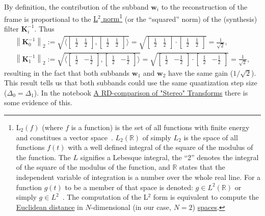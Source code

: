 By definition, the contribution of the subband ${\mathbf w}_i$ to the reconstruction of the frame  is
proportional to the
\href{https://en.wikipedia.org/wiki/Lp_space}{L$^2$
  norm}\footnote{L$_2(f)$ (where $f$ is a function) is the set of all
  functions with finite energy and constitues a vector
  space~\cite{sayood2017introduction}. $L_2({\mathbb R})$ of simply
  $L_2$ is the space of all functions $f(t)$ with a well defined
  integral of the square of the modulus of the function. The $L$
  signifies a Lebesque integral, the ``2'' denotes the integral of the
  square of the modulus of the function, and ${\mathbb R}$ states that
  the independent variable of integration is a number over the whole
  real line. For a function $g(t)$ to be a member of that space is
  denoted: $g\in L^2({\mathbb R})$ or simply
  $g\in L^2$~\cite{burrus2013wavelets}. The computation of the L$^2$
  form is equivalent to compute the
  \href{https://en.wikipedia.org/wiki/Euclidean_distance}{Euclidean
    distance} in $N$-dimensional (in our case, $N=2$)
  \href{https://en.wikipedia.org/wiki/Vector_space}{spaces}.} (or the
``squared'' norm) of the (synthesis) filter ${\mathbf K}_i^{-1}$. Thus
\begin{equation}
  \begin{array}{l}
    \left\| {\mathbf K}_0^{-1} \right\|_2 := \sqrt{\langle \begin{bmatrix} \frac{1}{2} & \frac{1}{2} \end{bmatrix}, \begin{bmatrix} \frac{1}{2} & \frac{1}{2} \end{bmatrix} \rangle} = \sqrt{\begin{bmatrix}\frac{1}{2} & \frac{1}{2} \end{bmatrix} \cdot \begin{bmatrix} \frac{1}{2} & \frac{1}{2} \end{bmatrix}} = \frac{1}{\sqrt{2}},\\
    \left\| {\mathbf K}_1^{-1} \right\|_2 := \sqrt{\langle \begin{bmatrix} \frac{1}{2} & -\frac{1}{2} \end{bmatrix}, \begin{bmatrix} \frac{1}{2} & -\frac{1}{2} \end{bmatrix} \rangle} = \sqrt{\begin{bmatrix} \frac{1}{2} & -\frac{1}{2} \end{bmatrix}\cdot \begin{bmatrix} \frac{1}{2} & -\frac{1}{2} \end{bmatrix}} = \frac{1}{\sqrt{2}},
  \end{array}
\end{equation}
resulting in the fact that both subbands ${\mathbf w}_1$ and ${\mathbf w}_2$ have
the same gain ($1/\sqrt{2}$). This result tells us that both subbands
could use the same quantization step size ($\Delta_0=\Delta_1$). In
the notebook
\href{https://github.com/Tecnologias-multimedia/Tecnologias-multimedia.github.io/blob/master/contents/transform_coding/stereo_transforms_RD.ipynb}{A
  RD-comparison of "Stereo" Transforms} there is some evidence of
this.

